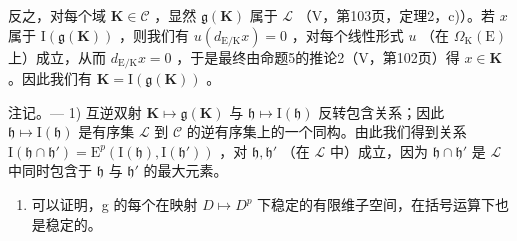 反之，对每个域 \(\mathbf{K} \in \mathcal{C}\) ，显然 \(\mathfrak{g}(\mathbf{K})\) 属于 \(\mathcal{L}\) （V，第103页，定理2，c)）。若 \(x\) 属于 \(\mathrm{I}(\mathfrak{g}(\mathbf{K}))\) ，则我们有 \(u(d_{\mathrm{E/K}} x) = 0\) ，对每个线性形式 \(u\) （在 \(\Omega_{\mathrm{K}}(\mathrm{E})\) 上）成立，从而 \(d_{\mathrm{E/K}} x = 0\) ，于是最终由命题5的推论2（V，第102页）得 \(x \in \mathbf{K}\) 。因此我们有 \(\mathbf{K} = \mathrm{I}(\mathfrak{g}(\mathbf{K}))\) 。

注记。--- 1) 互逆双射 \(\mathbf{K} \mapsto \mathfrak{g}(\mathbf{K})\) 与 \(\mathfrak{h} \mapsto \mathrm{I}(\mathfrak{h})\) 反转包含关系；因此 \(\mathfrak{h} \mapsto \mathrm{I}(\mathfrak{h})\) 是有序集 \(\mathcal{L}\) 到 \(\mathcal{C}\) 的逆有序集上的一个同构。由此我们得到关系 \(\mathrm{I}(\mathfrak{h} \cap \mathfrak{h}') = \mathrm{E}^p(\mathrm{I}(\mathfrak{h}), \mathrm{I}(\mathfrak{h}'))\) ，对 \(\mathfrak{h}, \mathfrak{h}'\) （在 \(\mathcal{L}\) 中）成立，因为 \(\mathfrak{h} \cap \mathfrak{h}'\) 是 \(\mathcal{L}\) 中同时包含于 \(\mathfrak{h}\) 与 \(\mathfrak{h}'\) 的最大元素。

\begin{enumerate}
\def\labelenumi{\arabic{enumi})}
\setcounter{enumi}{1}
\tightlist
\item
  可以证明，g 的每个在映射 \(D \mapsto D^{p}\) 下稳定的有限维子空间，在括号运算下也是稳定的。
\end{enumerate}

